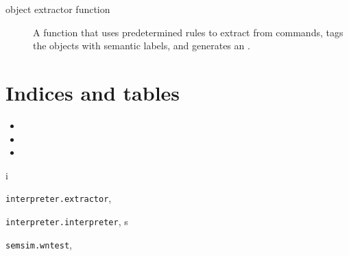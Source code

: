 \documentclass[letterpaper,10pt,english]{sphinxmanual}
\begin{document}
\label{terms:object-extractor-function}\begin{description}
\item[{object extractor function}] \leavevmode
A function that uses predetermined rules to extract {\hyperref[terms:object]{\emph{}}} from commands, tags the objects with semantic labels, and generates an {\hyperref[terms:object-dictionary]{\emph{}}}.

\end{description}


\chapter{Indices and tables}
\label{index:indices-and-tables}\begin{itemize}
\item {} 

\item {} 

\item {} 

\end{itemize}


\renewcommand{\indexname}{Python Module Index}
\begin{theindex}
\def\bigletter#1{{\Large\sffamily#1}\nopagebreak\vspace{1mm}}
\bigletter{i}
\item {\texttt{interpreter.extractor}}, \pageref{extractor:module-interpreter.extractor}
\item {\texttt{interpreter.interpreter}}, \pageref{interpreter:module-interpreter.interpreter}
\indexspace
\bigletter{s}
\item {\texttt{semsim.wntest}}, \pageref{wntest:module-semsim.wntest}
\end{theindex}

\renewcommand{\indexname}{Index}
\printindex
\end{document}

